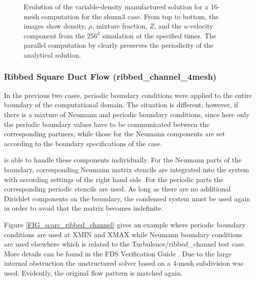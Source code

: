 \begin{figure}[ht]
\caption[Evolution of the variable-density manufactured solution for a 16-mesh \scarc{} computation]{Evolution of the variable-density manufactured solution for a 16-mesh \scarc{} computation for the {\ct shunn3} case.  From top to bottom, the images show density, $\rho$, mixture fraction, $Z$, and the $u$-velocity component from the $256^2$ simulation at the specified times. The parallel computation by \scarc{} clearly preserves the periodicity of the analytical solution.}
\label{FIG_scarc_shunn3}
\end{figure}




\subsubsection{Ribbed Square Duct Flow ({\ct ribbed\_channel\_4mesh})}

In the previous two cases, periodic boundary conditions were applied to the entire boundary of the computational domain. The situation is different, however, if there is a mixture of Neumann and periodic boundary conditions, since here only the periodic boundary values have to be communicated between the corresponding partners, while those for the Neumann components are set according to the boundary specifications of the case.

\newpage
\scarc{} is able to handle these components individually. For the Neumann parts of the boundary, corresponding Neumann matrix stencils are integrated into the system with according settings of the right hand side. For the periodic parts the corresponding periodic stencils are used.
As long as there are no additional Dirichlet components on the boundary, the condensed system must be used again
in order to avoid that the matrix becomes indefinite. 

Figure \ref{FIG_scarc_ribbed_channel} gives an example where periodic boundary conditions are used at
{\ct XMIN} and {\ct XMAX} while Neumann boundary conditions are used elsewhere which is related to the
Turbulence/ribbed\_channel test case.
More details can be found in the FDS Verification Guide \cite{McGrattan:2018:VG}.
Due to the large internal obstruction the unstructured \uscarc{} solver based on a 4-mesh subdivision was used. Evidently, the original flow pattern is matched again. 

